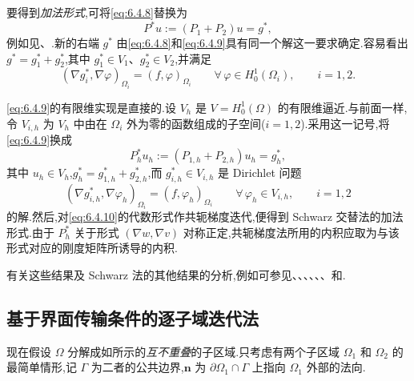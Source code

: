 要得到\emph{加法形式},可将\eqref{eq:6.4.8}替换为
\begin{equation}\label{eq:6.4.9}
  P^*u:=(P_1+P_2)u=g^*,
\end{equation}
例如见、.新的右端 \(g^*\) 由\eqref{eq:6.4.8}和\eqref{eq:6.4.9}具有同一个解这一要求确定.容易看出 \(g^*=g_1^*+g_2^*\),其中 \(g_1^*\in V_1\)、\(g_2^*\in V_2\),并满足
\[
  (\nabla g_i^*,\nabla\varphi)_{\Omega_i}=(f,\varphi)_{\Omega_i}
  \qquad\forall\,\varphi\in H_0^1(\Omega_i),\qquad i=1,2.
\]

\eqref{eq:6.4.9}的有限维实现是直接的.设 \(V_h\) 是 \(V=H_0^1(\Omega)\) 的有限维逼近.与前面一样,令 \(V_{i,h}\) 为 \(V_h\) 中由在 \(\Omega_i\) 外为零的函数组成的子空间(\(i=1,2\)).采用这一记号,将\eqref{eq:6.4.9}换成
\begin{equation}\label{eq:6.4.10}
  P_h^*u_h:=(P_{1,h}+P_{2,h})u_h=g_h^*,
\end{equation}
其中 \(u_h\in V_h\),\(g_h^*=g_{1,h}^*+g_{2,h}^*\),而 \(g_{i,h}^*\in V_{i,h}\) 是 Dirichlet 问题
\begin{equation}\label{eq:6.4.11}
  (\nabla g_{i,h}^*,\nabla\varphi_h)_{\Omega_i}=(f,\varphi_h)_{\Omega_i}
   \qquad\forall\,\varphi_h\in V_{i,h},\qquad i=1,2
\end{equation}
的解.然后,对\eqref{eq:6.4.10}的代数形式作共轭梯度迭代,便得到 Schwarz 交替法的加法形式.由于 \(P_h^*\) 关于形式 \((\nabla w,\nabla v)\) 对称正定,共轭梯度法所用的内积应取为与该形式对应的刚度矩阵所诱导的内积.

有关这些结果及 Schwarz 法的其他结果的分析,例如可参见、、、、、、和.

\subsection{基于界面传输条件的逐子域迭代法}\label{sec:6.4.2}

现在假设 \(\Omega\) 分解成如所示的\emph{互不重叠}的子区域.只考虑有两个子区域 \(\Omega_1\) 和 \(\Omega_2\) 的最简单情形,记 \(\Gamma\) 为二者的公共边界,\(\boldsymbol{n}\) 为 \(\partial\Omega_1\cap\Gamma\) 上指向 \(\Omega_1\) 外部的法向.


